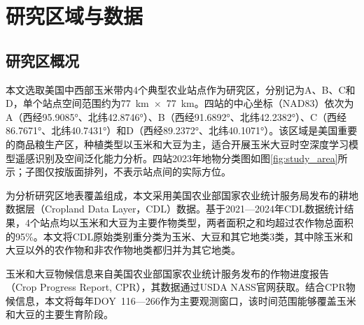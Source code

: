 
\section{研究区域与数据}

\subsection{研究区概况}

本文选取美国中西部玉米带内4个典型农业站点作为研究区，分别记为A、B、C和D，单个站点空间范围约为77~km~$\times$~77~km。四站的中心坐标（NAD83）依次为A（西经95.9085°、北纬42.8746°）、B（西经91.6892°、北纬42.2382°）、C（西经86.7671°、北纬40.7431°）和D（西经89.2372°、北纬40.1071°）。该区域是美国重要的商品粮生产区，种植类型以玉米和大豆为主，适合开展玉米大豆时空深度学习模型遥感识别及空间泛化能力分析。四站2023年地物分类图如图\ref{fig:study_area}所示；子图仅按版面排列，不表示站点间的实际方位。

为分析研究区地表覆盖组成，本文采用美国农业部国家农业统计服务局发布的耕地数据层（Cropland Data Layer，CDL）数据。基于2021—2024年CDL数据统计结果，4个站点均以玉米和大豆为主要作物类型，两者面积之和均超过农作物总面积的95\%。本文将CDL原始类别重分类为玉米、大豆和其它地类3类，其中除玉米和大豆以外的农作物和非农作物地类都归并为其它地类。

玉米和大豆物候信息来自美国农业部国家农业统计服务发布的作物进度报告（Crop Progress Report, CPR），其数据通过USDA NASS官网获取。结合CPR物候信息，本文将每年DOY~116—266作为主要观测窗口，该时间范围能够覆盖玉米和大豆的主要生育阶段。

